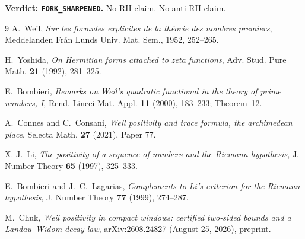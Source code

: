 \documentclass[11pt]{article}
\begin{document}
\noindent
\textbf{Verdict: \texttt{FORK\_SHARPENED}.}
No RH claim.  No anti-RH claim.

\begin{thebibliography}{9}
A.~Weil, \emph{Sur les formules explicites de la th\'eorie des
nombres premiers}, Meddelanden Fr\r an Lunds Univ. Mat. Sem.,
1952, 252--265.

H.~Yoshida, \emph{On Hermitian forms attached to zeta functions},
Adv. Stud. Pure Math. \textbf{21} (1992), 281--325.

E.~Bombieri, \emph{Remarks on Weil's quadratic functional in the
theory of prime numbers, I}, Rend. Lincei Mat. Appl.
\textbf{11} (2000), 183--233; Theorem~12.

A.~Connes and C.~Consani, \emph{Weil positivity and trace formula,
the archimedean place}, Selecta Math. \textbf{27} (2021), Paper 77.

X.-J.~Li, \emph{The positivity of a sequence of numbers and the
Riemann hypothesis}, J. Number Theory \textbf{65} (1997), 325--333.

E.~Bombieri and J.~C.~Lagarias,
\emph{Complements to Li's criterion for the Riemann hypothesis},
J. Number Theory \textbf{77} (1999), 274--287.

M.~Chuk, \emph{Weil positivity in compact windows: certified
two-sided bounds and a Landau--Widom decay law},
arXiv:2608.24827 (August 25, 2026), preprint.
\end{thebibliography}
\end{document}
